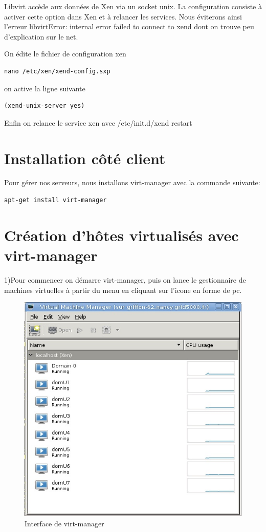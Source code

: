 Libvirt accède aux données de Xen via un socket unix. La configuration consiste à activer cette option dans Xen et à relancer les services.
Nous éviterons ainsi l’erreur libvirtError: internal error failed to connect to xend dont on trouve peu d’explication sur le net.

On édite le fichier de configuration xen
\begin{lstlisting} 
nano /etc/xen/xend-config.sxp
\end{lstlisting}
 on active la ligne suivante
\begin{lstlisting} 
(xend-unix-server yes)
\end{lstlisting}
 Enfin on relance le service xen avec /etc/init.d/xend restart

\section{Installation côté client}
Pour gérer nos serveurs, nous installons virt-manager avec la commande suivante:
\begin{lstlisting} 
apt-get install virt-manager
\end{lstlisting}

\section{Création d'hôtes virtualisés avec virt-manager}
1)Pour commencer on démarre virt-manager, puis on lance le gestionnaire de machines virtuelles à partir du menu en cliquant sur l'icone en forme de pc.

\begin{figure}
\begin{center}
\includegraphics[width=350pt]{images/virt.jpg}
\end{center}
\caption{Interface de virt-manager}
\end{figure}



